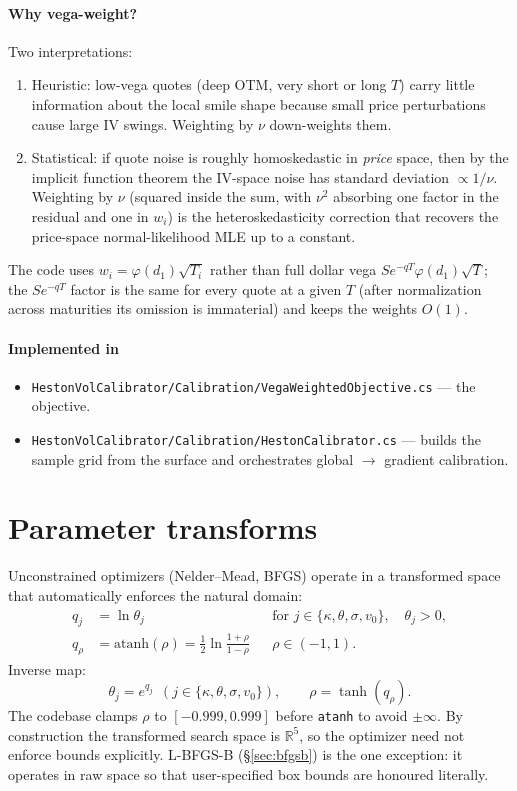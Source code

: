 \documentclass[11pt,a4paper]{article}
\begin{document}
\paragraph*{Why vega-weight?} Two interpretations:
\begin{enumerate}
\item Heuristic: low-vega quotes (deep OTM, very short or long $T$) carry little
information about the local smile shape because small price perturbations cause
large IV swings. Weighting by $\nu$ down-weights them.
\item Statistical: if quote noise is roughly homoskedastic in \emph{price} space,
then by the implicit function theorem the IV-space noise has standard deviation
$\propto 1/\nu$. Weighting by $\nu$ (squared inside the sum, with $\nu^2$
absorbing one factor in the residual and one in $w_i$) is the heteroskedasticity
correction that recovers the price-space normal-likelihood MLE up to a constant.
\end{enumerate}
The code uses $w_i = \varphi(d_1)\sqrt{T_i}$ rather than full dollar vega
$S e^{-qT}\varphi(d_1)\sqrt{T}$; the $S e^{-qT}$ factor is the same for every
quote at a given $T$ (after normalization across maturities its omission is
immaterial) and keeps the weights $O(1)$.

\paragraph*{Implemented in}
\begin{itemize}
\item \texttt{HestonVolCalibrator/Calibration/VegaWeightedObjective.cs} --- the objective.
\item \texttt{HestonVolCalibrator/Calibration/HestonCalibrator.cs} --- builds the sample grid from the surface and orchestrates global $\to$ gradient calibration.
\end{itemize}

\section{Parameter transforms}
\label{sec:transforms}
Unconstrained optimizers (Nelder--Mead, BFGS) operate in a transformed space
that automatically enforces the natural domain:
\begin{align*}
q_j &= \ln \theta_j  &&\text{for } j \in \{\kappa, \theta, \sigma, v_0\}, \quad \theta_j > 0,\\
q_\rho &= \mathrm{atanh}(\rho) = \tfrac12 \ln\!\frac{1+\rho}{1-\rho}  &&\rho \in (-1, 1).
\end{align*}
Inverse map:
\[
\theta_j = e^{q_j}\ \ (j \in \{\kappa, \theta, \sigma, v_0\}), \qquad \rho = \tanh(q_\rho).
\]
The codebase clamps $\rho$ to $[-0.999, 0.999]$ before \texttt{atanh} to avoid $\pm\infty$.
By construction the transformed search space is $\mathbb{R}^5$, so the optimizer
need not enforce bounds explicitly. L-BFGS-B (\S\ref{sec:bfgsb}) is the one
exception: it operates in raw space so that user-specified box bounds are
honoured literally.
\end{document}
